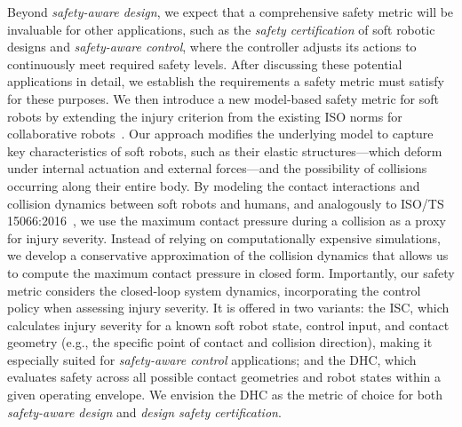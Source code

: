 Beyond \emph{safety-aware design}, we expect that a comprehensive safety metric will be invaluable for other applications, such as the \emph{safety certification} of soft robotic designs and \emph{safety-aware control}, where the controller adjusts its actions to continuously meet required safety levels. After discussing these potential applications in detail, we establish the requirements a safety metric must satisfy for these purposes. We then introduce a new model-based safety metric for soft robots by extending the injury criterion from the existing ISO norms for collaborative robots~\citep{Isots_15066_2016}. Our approach modifies the underlying model to capture key characteristics of soft robots, such as their elastic structures—which deform under internal actuation and external forces—and the possibility of collisions occurring along their entire body. By modeling the contact interactions and collision dynamics between soft robots and humans, and analogously to ISO/TS 15066:2016~\citep{Isots_15066_2016}, we use the maximum contact pressure during a collision as a proxy for injury severity. Instead of relying on computationally expensive simulations, we develop a conservative approximation of the collision dynamics that allows us to compute the maximum contact pressure in closed form. Importantly, our safety metric considers the closed-loop system dynamics, incorporating the control policy when assessing injury severity. It is offered in two variants: the \gls{ISC}, which calculates injury severity for a known soft robot state, control input, and contact geometry (e.g., the specific point of contact and collision direction), making it especially suited for \emph{safety-aware control} applications; and the \gls{DHC}, which evaluates safety across all possible contact geometries and robot states within a given operating envelope. We envision the \gls{DHC} as the metric of choice for both \emph{safety-aware design} and \emph{design safety certification}.